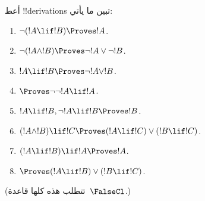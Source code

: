 \documentclass[../../../include/open-logic-section]{subfiles}
\begin{document}
\begin{prob}
أعط !!{derivation}s تبين ما يأتي:
\begin{enumerate}
\item $\lnot(!A \lif !B) \Proves !A$.
\item $\lnot(!A \land !B) \Proves \lnot !A \lor \lnot !B$.
\item $!A \lif !B \Proves \lnot !A \lor !B$.
\item $\Proves \lnot \lnot !A \lif !A$.
\item $!A \lif !B, \lnot !A \lif !B \Proves !B$.
\item $(!A \land !B) \lif !C \Proves (!A \lif !C) \lor (!B \lif !C)$.
\item $(!A \lif !B) \lif !A \Proves !A$.
\item $\Proves (!A \lif !B) \lor (!B \lif !C)$.
\end{enumerate}
(تتطلب هذه كلها قاعدة~$\FalseCl$.)
\end{prob}
\end{document}
